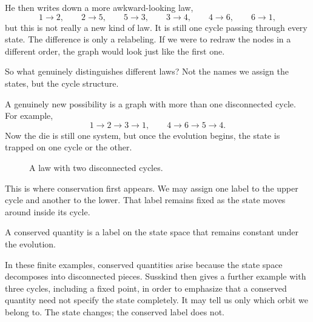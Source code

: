 He then writes down a more awkward-looking law,
\[
1\to 2,\qquad 2\to 5,\qquad 5\to 3,\qquad 3\to 4,\qquad 4\to 6,\qquad 6\to 1,
\]
but this is not really a new kind of law. It is still one cycle passing through every state. The difference is only a relabeling. If we were to redraw the nodes in a different order, the graph would look just like the first one.

So what genuinely distinguishes different laws? Not the names we assign the states, but the cycle structure.

A genuinely new possibility is a graph with more than one disconnected cycle. For example,
\[
1\to 2\to 3\to 1,
\qquad
4\to 6\to 5\to 4.
\]
Now the die is still one system, but once the evolution begins, the state is trapped on one cycle or the other.

\begin{figure}
\centering
{}
\caption{A law with two disconnected cycles.}
\end{figure}

This is where conservation first appears. We may assign one label to the upper cycle and another to the lower. That label remains fixed as the state moves around inside its cycle.

\begin{definition}
A conserved quantity is a label on the state space that remains constant under the evolution.
\end{definition}

In these finite examples, conserved quantities arise because the state space decomposes into disconnected pieces. Susskind then gives a further example with three cycles, including a fixed point, in order to emphasize that a conserved quantity need not specify the state completely. It may tell us only which orbit we belong to. The state changes; the conserved label does not.

